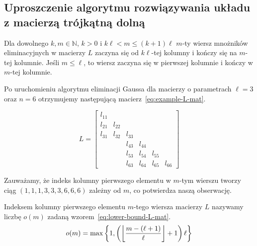 \documentclass[../analysis.tex]{subfiles}
\begin{document}
  \subsection{Uproszczenie algorytmu rozwiązywania układu z macierzą trójkątną dolną}
  \begin{observation}
    Dla dowolnego \( k, m \in \mathbb{N} \), \( k > 0 \)
    i \( k\ell < m \le (k + 1) \ell \) \( m \)-ty wiersz mnożników eliminacyjnych 
    w macierzy \( L \)
    zaczyna się od \(k \ell \)-tej kolumny i kończy się na
    \( m \)-tej kolumnie. Jeśli \( m \le \ell \), to wiersz zaczyna się w pierwszej kolumnie
    i kończy w \( m \)-tej kolumnie.
  \end{observation}
  \begin{example}
    Po uruchomieniu algorytmu eliminacji Gaussa dla macierzy o parametrach \( \ell = 3 \)
    oraz \( n = 6 \) otrzymujemy następującą macierz~\ref{eq:example-L-mat}.

    \begin{equation} \label{eq:example-L-mat}
      L = \begin{bmatrix}
        l_{11}    &         &         &         &       & \\
        l_{21}    & l_{22}  &         &         &       & \\
        l_{31}    & l_{32}  & l_{33}  &         &       & \\
                  &         & l_{43}  & l_{44}  &       & \\
                  &         & l_{53}  & l_{54}  & l_{55}& \\
                  &         & l_{63}  & l_{64}  & l_{65}& l_{66}
      \end{bmatrix}
    \end{equation}

    Zauważamy, że indeks kolumny pierwszego elementu w \( m \)-tym wierszu
    tworzy ciąg \( (1, 1, 1, 3, 3, 3, 6, 6, 6) \) zależny od \( m \), co potwierdza
    naszą obserwację.
  \end{example}
  \begin{corollary} \label{col:lower-bound-L-mat} 
    Indeksem kolumny pierwszego elementu \( m \)-tego wiersza macierzy \( L \) nazywamy liczbę
    \( o(m) \) zadaną wzorem~\ref{eq:lower-bound-L-mat}.
    \begin{equation} \label{eq:lower-bound-L-mat}
      o(m) = \max \left\{ 1, \left( \floor*{\frac{m - (\ell + 1)}{\ell}} + 1 \right) \ell \right\}
    \end{equation}
  \end{corollary}
\end{document}
